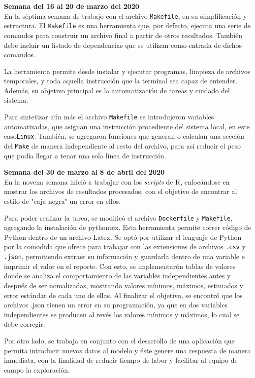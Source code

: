 \documentclass{article}
\begin{document}
    \textbf{Semana  del 16 al 20 de marzo del 2020} \\
    En la séptima semana de trabajo con el archivo \texttt{Makefile}, en su simplificación y estructura. El \texttt{Makefile} es una herramienta que, por defecto, ejecuta una serie de comandos para construir un archivo final a partir de otros resultados. También debe incluir un listado de dependencias que se utilizan como entrada de dichos comandos.
    
    La herramienta permite desde instalar y ejecutar programas, limpieza de archivos temporales, y toda aquella instrucción que la terminal sea capaz de entender. Además, su objetivo principal es la automatización de tareas y cuidado del sistema. 
    
    Para sintetizar aún más el archivo \texttt{Makefile} se introdujeron variables automatizadas, que asignan una instrucción procediente del sistema local, en este caso\texttt{Linux}. También, se agregaron funciones que generan o calculan una sección del \texttt{Make} de manera independiente al resto del archivo, para así reducir el peso que podía llegar a tenar una sola línea de instrucción.
    
    \textbf{Semana  del 30 de marzo al 8 de abril del 2020} \\
    En la novena semana inició a trabajar con los \textit{scripts} de R, enfocándose en mostrar los archivos de resultados procesados, con el objetivo de encontrar al estilo de "caja negra" un error en ellos.
    
    Para poder realizar la tarea, se modificó el archivo \texttt{Dockerfile} y \texttt{Makefile}, agregando la instalación de pythontex. Esta herramienta permite correr código de Python dentro de un archivo Latex. Se optó por utilizar el lenguaje de Python por la comodida que ofrece para trabajar con las extensiones de archivos \texttt{.csv} y \texttt{.json}, permitiendo extraer su información y guardarla dentro de una variable e imprimir el valor en el reporte. Con esto, se implementarón tablas de valores donde se analiza el comportamiento de las variables independientes antes y después de ser nomalizadas, mostrando valores mínimos, máximos, estimados y error estándar de cada uno de ellas.
    Al finalizar el objetivo, se encontró que los archivos .json tienen un error en su programación, ya que en dos variables independientes se producen al revés los valores mínimos y máximos, lo cual se debe corregir.
    
    Por otro lado, se trabaja en conjunto con el desarrollo de una aplicación que permita introducir nuevos datos al modelo y éste genere una respuesta de manera inmediata, con la finalidad de reducir tiempo de labor y  facilitar al equipo de campo la exploración.
    
\end{document}
